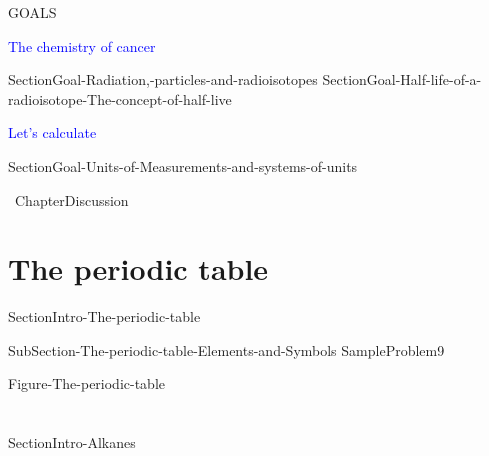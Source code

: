 \documentclass[main.tex]{subfiles}
\begin{document}
\begin{marginfigure}
\begin{mytcbox}{GOALS}
\begin{center}\textcolor{blue}{\faFlash The chemistry of cancer} \end{center}
\begin{enumerate}[label=\protect\circled{\color{white}\arabic*}]
{SectionGoal-Radiation,-particles-and-radioisotopes}
{SectionGoal-Half-life-of-a-radioisotope-The-concept-of-half-live}
	\end{enumerate}
\begin{center}\textcolor{blue}{\faFlash Let's calculate} \end{center}
\begin{enumerate}[label=\protect\circled{\color{white}\arabic*}]
{SectionGoal-Units-of-Measurements-and-systems-of-units}
 	\end{enumerate}
			 				 
%



\end{mytcbox}
\vspace{1cm}
\begin{tcolorbox}[enhanced,colback=red!5!white,colframe=black!50!red,boxrule=1pt,
  arc=0pt,outer arc=0pt,drop heavy lifted shadow]
\faGears\ 
{ChapterDiscussion}
\end{tcolorbox}
\end{marginfigure}%


\section{\faEnvira The periodic table}
{SectionIntro-The-periodic-table}
\sloppy
\begin{description}
{SubSection-The-periodic-table-Elements-and-Symbols}
{SampleProblem9}

\end{description}
\hspace{-10cm}  {Figure-The-periodic-table} 


\section{\color{blue!30!black}{\faEnvira Alkanes}}
{SectionIntro-Alkanes}
\end{document}
